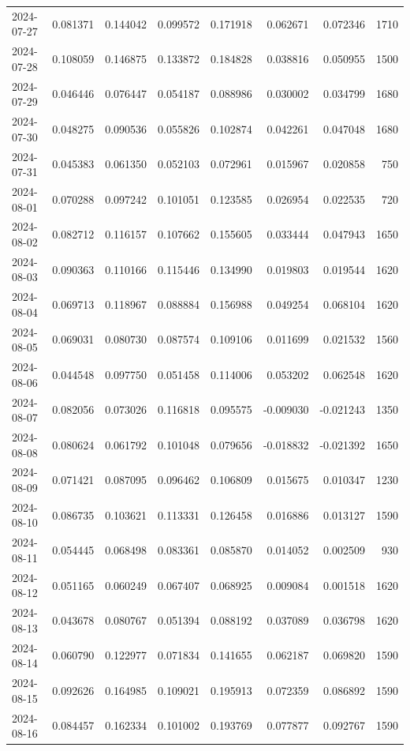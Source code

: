 \begin{tabular}{lrrrrrrr}
2024-07-27 & 0.081371 & 0.144042 & 0.099572 & 0.171918 & 0.062671 & 0.072346 & 1710 \\
2024-07-28 & 0.108059 & 0.146875 & 0.133872 & 0.184828 & 0.038816 & 0.050955 & 1500 \\
2024-07-29 & 0.046446 & 0.076447 & 0.054187 & 0.088986 & 0.030002 & 0.034799 & 1680 \\
2024-07-30 & 0.048275 & 0.090536 & 0.055826 & 0.102874 & 0.042261 & 0.047048 & 1680 \\
2024-07-31 & 0.045383 & 0.061350 & 0.052103 & 0.072961 & 0.015967 & 0.020858 & 750 \\
2024-08-01 & 0.070288 & 0.097242 & 0.101051 & 0.123585 & 0.026954 & 0.022535 & 720 \\
2024-08-02 & 0.082712 & 0.116157 & 0.107662 & 0.155605 & 0.033444 & 0.047943 & 1650 \\
2024-08-03 & 0.090363 & 0.110166 & 0.115446 & 0.134990 & 0.019803 & 0.019544 & 1620 \\
2024-08-04 & 0.069713 & 0.118967 & 0.088884 & 0.156988 & 0.049254 & 0.068104 & 1620 \\
2024-08-05 & 0.069031 & 0.080730 & 0.087574 & 0.109106 & 0.011699 & 0.021532 & 1560 \\
2024-08-06 & 0.044548 & 0.097750 & 0.051458 & 0.114006 & 0.053202 & 0.062548 & 1620 \\
2024-08-07 & 0.082056 & 0.073026 & 0.116818 & 0.095575 & -0.009030 & -0.021243 & 1350 \\
2024-08-08 & 0.080624 & 0.061792 & 0.101048 & 0.079656 & -0.018832 & -0.021392 & 1650 \\
2024-08-09 & 0.071421 & 0.087095 & 0.096462 & 0.106809 & 0.015675 & 0.010347 & 1230 \\
2024-08-10 & 0.086735 & 0.103621 & 0.113331 & 0.126458 & 0.016886 & 0.013127 & 1590 \\
2024-08-11 & 0.054445 & 0.068498 & 0.083361 & 0.085870 & 0.014052 & 0.002509 & 930 \\
2024-08-12 & 0.051165 & 0.060249 & 0.067407 & 0.068925 & 0.009084 & 0.001518 & 1620 \\
2024-08-13 & 0.043678 & 0.080767 & 0.051394 & 0.088192 & 0.037089 & 0.036798 & 1620 \\
2024-08-14 & 0.060790 & 0.122977 & 0.071834 & 0.141655 & 0.062187 & 0.069820 & 1590 \\
2024-08-15 & 0.092626 & 0.164985 & 0.109021 & 0.195913 & 0.072359 & 0.086892 & 1590 \\
2024-08-16 & 0.084457 & 0.162334 & 0.101002 & 0.193769 & 0.077877 & 0.092767 & 1590 \\

\end{tabular}
